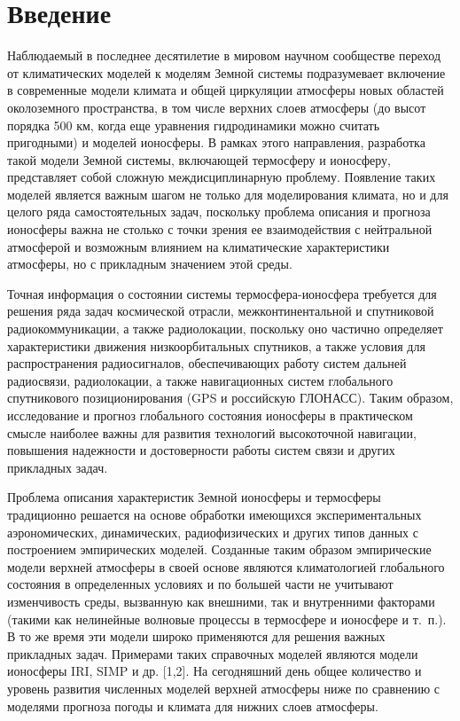 \documentclass[14pt, a4paper]{extarticle}
\begin{document}
\section{Введение}
Наблюдаемый в последнее десятилетие в мировом научном сообществе переход от климатических моделей к моделям Земной системы подразумевает включение в современные модели климата и общей циркуляции атмосферы новых областей околоземного пространства, в том числе верхних слоев атмосферы (до высот порядка 500 км, когда еще уравнения гидродинамики можно считать пригодными) и моделей ионосферы. В рамках этого направления, разработка такой модели Земной системы, включающей термосферу и ионосферу, представляет собой сложную междисциплинарную проблему. Появление таких моделей является важным шагом не только для моделирования климата, но и для целого ряда самостоятельных задач, поскольку проблема описания и прогноза ионосферы важна не столько с точки зрения ее взаимодействия с нейтральной атмосферой и возможным влиянием на климатические характеристики атмосферы, но с прикладным значением этой среды. 

Точная информация о состоянии системы термосфера-ионосфера требуется для решения ряда задач космической отрасли, межконтинентальной и спутниковой радиокоммуникации, а также радиолокации, поскольку оно частично определяет характеристики движения низкоорбитальных спутников, а также условия для распространения радиосигналов, обеспечивающих работу систем дальней радиосвязи, радиолокации, а также навигационных систем глобального спутникового позиционирования (GPS и российскую ГЛОНАСС). Таким образом, исследование и прогноз глобального состояния ионосферы в практическом смысле наиболее важны для развития технологий высокоточной навигации, повышения надежности и достоверности работы систем связи и других прикладных задач. 

Проблема описания характеристик Земной ионосферы и термосферы традиционно решается на основе обработки имеющихся экспериментальных аэрономических, динамических, радиофизических и других типов данных с построением эмпирических моделей. Созданные таким образом эмпирические модели верхней атмосферы в своей основе являются климатологией глобального состояния в определенных условиях и по большей части не учитывают изменчивость среды, вызванную как внешними, так и внутренними факторами (такими как нелинейные волновые процессы в термосфере и ионосфере и т.~п.). В то же время эти модели широко применяются для решения важных прикладных задач. Примерами таких справочных моделей являются модели ионосферы IRI, SIMP и др. [1,2]. На сегодняшний день общее количество и уровень развития численных моделей верхней атмосферы ниже по сравнению с моделями прогноза погоды и климата для нижних слоев атмосферы. 
\end{document}
